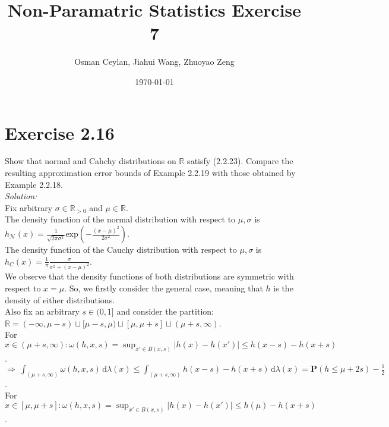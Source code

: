 \documentclass{article}
\title{Non-Paramatric Statistics Exercise 7}
\author{Osman Ceylan, Jiahui Wang, Zhuoyao Zeng}
\date{\today}
\begin{document}
\maketitle

\section*{Exercise 2.16} \vspace*{-1em}
Show that normal and Cahchy distributions on $\mathbb{R}$ satisfy (2.2.23). Compare the resulting approximation error bounds of Example 2.2.19 with those obtained by Example 2.2.18. \\
\textit{Solution:} \\
Fix arbitrary $\sigma \in \mathbb{R}_{>0}$ and $\mu \in \mathbb{R}$.\\
The density function of the normal distribution with respect to $\mu, \sigma$ is $h_{\mathcal{N}}(x) = \frac{1}{\sqrt{2 \pi \sigma ^2}} \text{exp}(- \frac{(x-\mu)^2}{2 \sigma ^2}) $. \vspace*{-1.4em} \\
The density function of the Cauchy distribution with respect to $\mu, \sigma$ is $h_{C}(x) = \frac{1}{ \pi }  \frac{ \sigma }{  \sigma ^2 + (x-\mu)^2  } $.  \vspace*{0.5em} \\
We observe that the density functions of both distributions are symmetric with respect to $x=\mu$. So, we firstly consider the general case, meaning that $h$ is the density of either distributions.\\ 
Also fix an arbitrary $s\in (0,1]$ and consider the partition: \\
\indent \indent \indent  \indent \indent \indent  $\mathbb{R} = ( -\infty, \mu - s) \sqcup [ \mu - s , \mu  )\sqcup [ \mu , \mu + s  ] \sqcup ( \mu + s , \infty )$.\\
For $x \in (\mu + s , \infty): \omega (h,x,s) = \sup_{x' \in B(x,s) } | h(x)-h(x') | \leq h(x-s) - h(x+s) $.  \vspace*{0.5em} \\
$\Rightarrow \ \displaystyle{ \int_{ ( \mu + s , \infty ) }  \omega (h,x,s)  \, \text{d}\lambda(x) \leq \int_{ ( \mu + s , \infty ) } h(x-s) - h(x+s)  \, \text{d}\lambda(x)  = \mathbf{P}( h\leq \mu + 2s )   - \frac{1}{2} }  $.   \vspace*{0.5em} \\
For $x \in  [ \mu , \mu + s  ] :  \omega (h,x,s) = \sup_{x' \in B(x,s) } | h(x)-h(x') | \leq h(\mu) - h(x+s) $.  \vspace*{0.5em} \\
\end{document}
